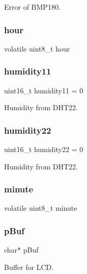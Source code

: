 Error of B\+M\+P180. 

\mbox{\label{main_8c_a906516b3d65fd10d5c2660092142bca9}} 
\subsubsection{hour}
{\footnotesize\ttfamily volatile uint8\+\_\+t hour}

\mbox{\label{main_8c_a6163a2874f30b4ddb9261bc58fd0e8ee}} 
\subsubsection{humidity11}
{\footnotesize\ttfamily uint16\+\_\+t humidity11 = 0}



Humidity from D\+H\+T22. 

\mbox{\label{main_8c_a239db18bf5ac595e5013d5ee730cb88e}} 
\subsubsection{humidity22}
{\footnotesize\ttfamily uint16\+\_\+t humidity22 = 0}



Humidity from D\+H\+T22. 

\mbox{\label{main_8c_ac0123c58393eaaf0c66523ef57e841c4}} 
\subsubsection{minute}
{\footnotesize\ttfamily volatile uint8\+\_\+t minute}

\mbox{\label{main_8c_a4edb4000a60dd3423af0d876ed4821e1}} 
\subsubsection{p\+Buf}
{\footnotesize\ttfamily char$\ast$ p\+Buf}



Buffer for L\+CD. 

\mbox{\label{main_8c_aca0d7b5328c3217ea6dfb2586c3723b8}} 
